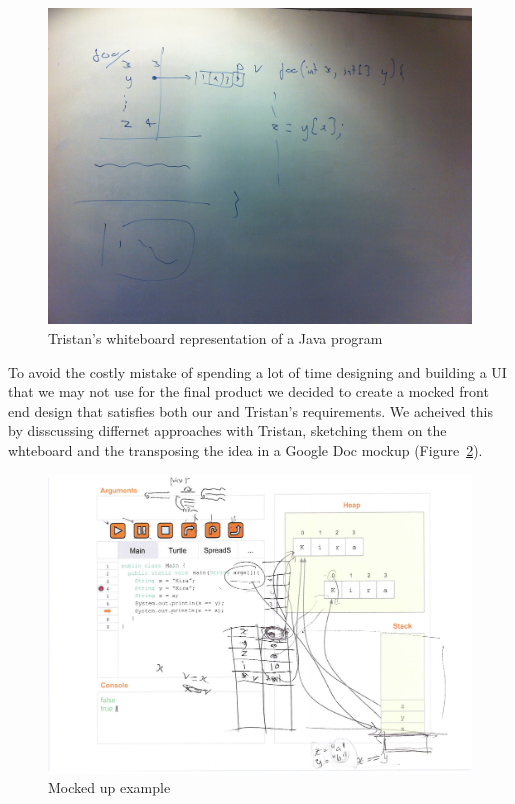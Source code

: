 \documentclass[11pt, a4paper]{article}
\begin{document}
\begin{figure}[h!]
\centering
\includegraphics[width=\textwidth]{sketch.jpg}
\caption{Tristan's whiteboard representation of a Java program}
\label{fig:sketch}
\end{figure}

To avoid the costly mistake of spending a lot of time designing and building a UI that we may not use for the final product we decided to create a mocked front end design that satisfies both our and Tristan's requirements. We acheived this by disscussing differnet approaches with Tristan, sketching them on the whteboard and the transposing the idea in a Google Doc mockup (Figure~\ref{fig:mockup}).

\begin{figure}[h!]
\centering
\includegraphics[width=\textwidth]{mockup.png}
\caption{Mocked up example}
\label{fig:mockup}
\end{figure}
\end{document}
